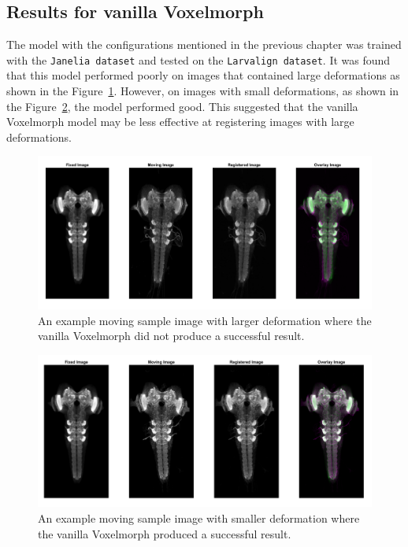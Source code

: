 \documentclass{book}
\begin{document}
	\subsection{Results for vanilla Voxelmorph}
	The model with the configurations mentioned in the previous chapter was trained with the \texttt{Janelia dataset} and tested on the \texttt{Larvalign dataset}. It was found that this model performed poorly on images that contained large deformations as shown in the Figure~\ref{fig:method1_fail}. However, on images with small deformations, as shown in the Figure~\ref{fig:method1_pas}, the model performed good. This suggested that the vanilla Voxelmorph model may be less effective at registering images with large deformations.
	
	\begin{figure}[h]
		\centering
		\includegraphics[width=0.8\columnwidth]{resources/chapter4/np_60H12_14E09_MB049B_020113B_scaled.tif.png}
		\caption{An example moving sample image with larger deformation where the vanilla Voxelmorph did not produce a successful result.}
		\label{fig:method1_fail}
	\end{figure}

	\begin{figure}[h]
		\centering
		\includegraphics[width=0.8\columnwidth]{resources/chapter4/np_brain7_scaled.tif.png}
		\caption{An example moving sample image with smaller deformation where the vanilla Voxelmorph produced a successful result.}
		\label{fig:method1_pas}
	\end{figure}
\end{document}
